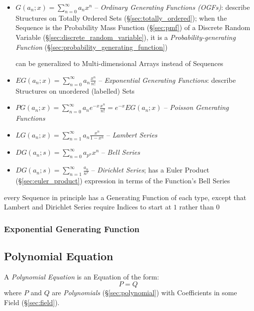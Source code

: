 \begin{itemize}
  \item $G(a_n; x) = \sum_{n=0}^\infty a_n x^n$ -- \emph{Ordinary Generating
    Functions (OGFs)}: describe Structures on Totally Ordered Sets
    (\S\ref{sec:totally_ordered}); when the Sequence is the Probability Mass
    Function (\S\ref{sec:pmf}) of a Discrete Random Variable
    (\S\ref{sec:discrete_random_variable}), it is a \emph{Probability-generating
      Function} (\S\ref{sec:probability_generating_function})

    can be generalized to Multi-dimensional Arrays instead of Sequences
  \item $EG(a_n; x) = \sum_{n=0}^\infty a_n \frac{x^n}{n!}$ -- \emph{Exponential
    Generating Functions}: describe Structures on unordered (labelled) Sets
  \item $PG(a_n; x) = \sum_{n=0}^\infty a_n e^{-x}\frac{x^n}{n!} = e^{-x}EG(a_n; x)$
    -- \emph{Poisson Generating Functions}
  \item $LG(a_n; x) = \sum_{n=1}^\infty a_n \frac{x^n}{1 - x^n}$ --
    \emph{Lambert Series}
  \item $DG(a_n; s) = \sum_{n=0}^\infty a_{p^n} x^n$ -- \emph{Bell Series}
  \item $DG(a_n; s) = \sum_{n=1}^\infty \frac{a_n}{n^s}$ --
    \emph{Dirichlet Series}; has a Euler Product (\S\ref{sec:euler_product})
    expression in terms of the Function's Bell Series
\end{itemize}

every Sequence in principle has a Generating Function of each type, except that
Lambert and Dirichlet Series require Indices to start at $1$ rather than $0$



\subsubsection{Exponential Generating Function}
\label{sec:exponential_generating_function}



\subsection{Polynomial Equation}\label{sec:polynomial_equation}

A \emph{Polynomial Equation} is an Equation of the form:
\[
  P = Q
\]
where $P$ and $Q$ are \emph{Polynomials} (\S\ref{sec:polynomial}) with
Coefficients in some Field (\S\ref{sec:field}).

